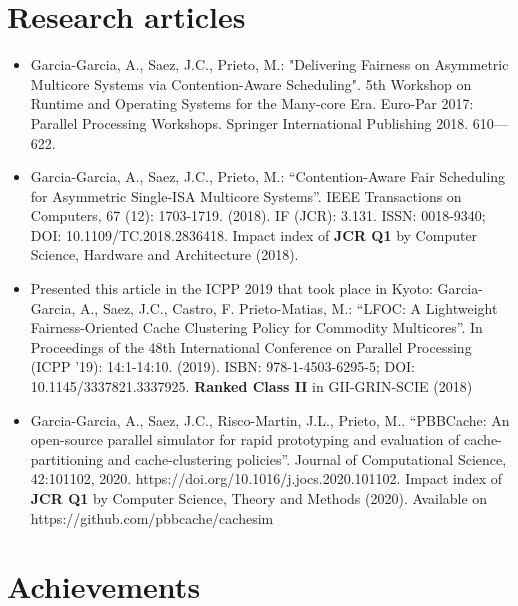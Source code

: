 \documentclass[10pt,a4paper,sans]{moderncv}        %
\begin{document}
\section{Research articles}
\begin{itemize}
\item Garcia-Garcia, A., Saez, J.C., Prieto, M.: "Delivering Fairness on Asymmetric Multicore Systems via Contention-Aware Scheduling". 5th Workshop on Runtime and Operating Systems for the Many-core Era. Euro-Par 2017: Parallel Processing Workshops. Springer International Publishing 2018. 610—622. 
\smallskip
\item Garcia-Garcia, A., Saez, J.C., Prieto, M.: “Contention-Aware Fair Scheduling for Asymmetric Single-ISA Multicore Systems”. IEEE Transactions on Computers, 67 (12): 1703-1719. (2018). IF (JCR): 3.131. ISSN: 0018-9340; DOI: 10.1109/TC.2018.2836418. Impact index of \textbf{JCR Q1} by Computer Science, Hardware and Architecture (2018).
\smallskip
\item Presented this article in the ICPP 2019 that took place in Kyoto: Garcia-Garcia, A., Saez, J.C., Castro, F. Prieto-Matias, M.: “LFOC: A Lightweight Fairness-Oriented Cache Clustering Policy for Commodity Multicores”. In Proceedings of the 48th International Conference on Parallel Processing (ICPP '19): 14:1-14:10. (2019).  ISBN: 978-1-4503-6295-5; DOI: 10.1145/3337821.3337925. \textbf{Ranked Class II} in GII-GRIN-SCIE (2018)
\smallskip
\item Garcia-Garcia, A., Saez, J.C., Risco-Martin, J.L., Prieto, M.. “PBBCache: An open-source parallel simulator for rapid prototyping and evaluation of cache-partitioning and cache-clustering policies”. Journal of Computational Science, 42:101102, 2020. https://doi.org/10.1016/j.jocs.2020.101102. Impact index of \textbf{JCR Q1} by Computer Science, Theory and Methods (2020). Available on https://github.com/pbbcache/cachesim
\end{itemize}


\section{Achievements}
\end{document}
